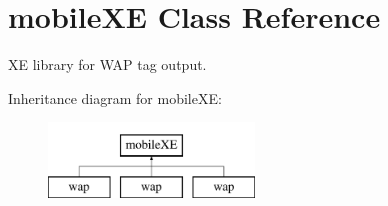 \hypertarget{classmobileXE}{}\section{mobile\+XE Class Reference}
\label{classmobileXE}


XE library for W\+AP tag output.  


Inheritance diagram for mobile\+XE\+:\begin{figure}[H]
\begin{center}
\leavevmode
\includegraphics[height=2.000000cm]{classmobileXE}
\end{center}
\end{figure}
